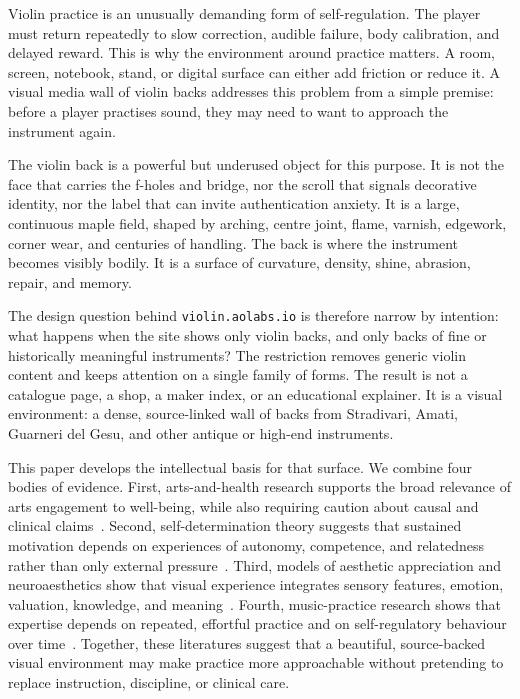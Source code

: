 \documentclass[12pt,letterpaper]{article}
\begin{document}
Violin practice is an unusually demanding form of self-regulation. The player must return repeatedly to slow correction, audible failure, body calibration, and delayed reward. This is why the environment around practice matters. A room, screen, notebook, stand, or digital surface can either add friction or reduce it. A visual media wall of violin backs addresses this problem from a simple premise: before a player practises sound, they may need to want to approach the instrument again.

The violin back is a powerful but underused object for this purpose. It is not the face that carries the f-holes and bridge, nor the scroll that signals decorative identity, nor the label that can invite authentication anxiety. It is a large, continuous maple field, shaped by arching, centre joint, flame, varnish, edgework, corner wear, and centuries of handling. The back is where the instrument becomes visibly bodily. It is a surface of curvature, density, shine, abrasion, repair, and memory.

The design question behind \texttt{violin.aolabs.io} is therefore narrow by intention: what happens when the site shows only violin backs, and only backs of fine or historically meaningful instruments? The restriction removes generic violin content and keeps attention on a single family of forms. The result is not a catalogue page, a shop, a maker index, or an educational explainer. It is a visual environment: a dense, source-linked wall of backs from Stradivari, Amati, Guarneri del Gesu, and other antique or high-end instruments.

This paper develops the intellectual basis for that surface. We combine four bodies of evidence. First, arts-and-health research supports the broad relevance of arts engagement to well-being, while also requiring caution about causal and clinical claims~\cite{fancourt_arts_2019}. Second, self-determination theory suggests that sustained motivation depends on experiences of autonomy, competence, and relatedness rather than only external pressure~\cite{ryan_self_2000}. Third, models of aesthetic appreciation and neuroaesthetics show that visual experience integrates sensory features, emotion, valuation, knowledge, and meaning~\cite{leder_model_2004,chatterjee_neuroaesthetics_2014}. Fourth, music-practice research shows that expertise depends on repeated, effortful practice and on self-regulatory behaviour over time~\cite{ericsson_deliberate_1993,mcpherson_self_2001}. Together, these literatures suggest that a beautiful, source-backed visual environment may make practice more approachable without pretending to replace instruction, discipline, or clinical care.
\end{document}
